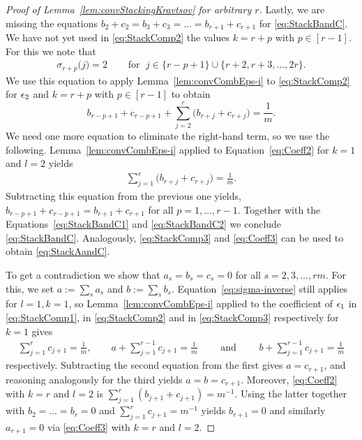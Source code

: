 \begin{proof}[Proof of Lemma~\ref{lem:convStackingKravtsov} for arbitrary $r$]
	
	Lastly, we are missing the equations $b_2 + c_2 = b_3 + c_3 = \ldots = b_{r+1} + c_{r+1}$  for \eqref{eq:StackBandC}. We have not yet used in \eqref{eq:StackComp2} the values $k = r + p$ with $p \in [r-1]$. For this we note that
	\begin{align*}
		\sigma_{r + p} \big(j \big) =  2 \quad &\text{ for } \; j \in  \{r - p + 1\} \cup \{r + 2, r + 3, \dots, 2 r\}.
	\end{align*}
	We use this equation to apply Lemma~\ref{lem:convCombEps-i} to \eqref{eq:StackComp2} for $\epsilon_2$ and $k=r + p$ with $p \in [r-1]$ to obtain 
	$$ b_{r - p + 1} + c_{r - p +1} + \sum_{j=2}^{r} \big( b_{r + j} + c_{r + j} \big) = \frac{1}{m}.
	$$
	We need one more equation to eliminate the right-hand term, so we use the following. Lemma~\ref{lem:convCombEps-i} applied to 
	Equation~\eqref{eq:Coeff2} for $k=1$ and $l=2$ yields
	\begin{align*}
		\sum_{j=1}^r \big( b_{r + j} + c_{r + j} \big) = \frac{1}{m}.
	\end{align*}
	Subtracting this equation from the previous one yields, $b_{r - p + 1} + c_{r - p +1} = b_{r+1} + c_{r + 1}$ for all $p = 1,\ldots,r-1$. Together with the Equations~\eqref{eq:StackBandC1} and \eqref{eq:StackBandC2} we conclude \eqref{eq:StackBandC}. Analogously, \eqref{eq:StackComp3} and \eqref{eq:Coeff3} can be used to obtain
	\eqref{eq:StackAandC}. 
	
	To get a contradiction we show that $a_s = b_s = c_s = 0$ for all $s = 2,3,\ldots, r m$. For this, we set $a := \sum_{s} a_s$ and $b := \sum_s b_s$. Equation~\eqref{eq:sigma-inverse} still applies for $l =1, k = 1$, so Lemma~\ref{lem:convCombEps-i} applied to the coefficient of $\epsilon_1$ in \eqref{eq:StackComp1}, in \eqref{eq:StackComp2} and in \eqref{eq:StackComp3} respectively for $k=1$ gives
	\begin{align*}
		\sum_{j=1}^{r} c_{j+1} = \frac{1}{m}, \qquad a + \sum_{j=1}^{r-1} c_{j+1} = \frac{1}{m} \qquad \text{ and } \qquad
		b + \sum_{j=1}^{r-1} c_{j+1} = \frac{1}{m}
	\end{align*}
	respectively. Subtracting the second equation from the first gives $a=c_{r+1}$, and reasoning analogously for the third yields $a=b=c_{r+1}$. Moreover, \eqref{eq:Coeff2} with $k=r$ and $l=2$ is $\sum_{j=1}^r (b_{j+1} + c_{j+1}) = m^{-1}$. Using the latter together with $b_2 = \ldots = b_r = 0$ and $\sum_{j=1}^{r} c_{j+1} = m^{-1}$ yields $b_{r+1} = 0$ and similarly $a_{r+1} = 0$ via \eqref{eq:Coeff3} with $k=r$ and $l=2$.
	

\end{proof}
